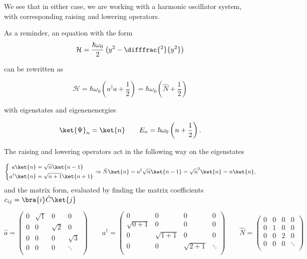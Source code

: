    We  see that  in  either case,  we  are working  with a  harmonic  oscillator system,  with
   corresponding raising and lowering operators.
   
   {\scriptsize As a reminder, an equation with the form
     \[
       \mathcal{H} = \frac{\hbar\omega_0}{2}\left(y^2-\difffrac{^2}{y^2}\right)
     \]
		
     \noindent can be rewritten as
		
		\[
                  \mathcal{H}       =      \hbar\omega_0\left(a^{\dagger}a+\frac{1}{2}\right)=
                  \hbar\omega_0\left(\hat{N}+\frac{1}{2}\right)
		\]
		
		with eigenstates and eigenenenergies
		
		\[
                  \ket{\Psi}_n=\ket{n} \qquad E_n= \hbar\omega_0\left(n+\frac{1}{2}\right).
		\]
		
		\noindent The raising  and lowering operators act in the  following way on the
                eigenstates
		
		\[
                  \left\lbrace\begin{aligned}
                      a\ket{n} & = \sqrt{n}\ket{n-1}\\
                      a^{\dagger}\ket{n} &= \sqrt{n+1}\ket{n+1}\\
                    \end{aligned}\right. \Rightarrow
                  \hat{N}\ket{n} = a^{\dagger}  \sqrt{n}\ket{n-1} = \sqrt{n}^2\ket{n}=n\ket{n}
                  ,
		\]
		\noindent and  the matrix form,  evaluated by finding the  matrix coefficients
                $ c_{ij}=\bra{i}\hat{C}\ket{j} $
		
		\[
                  \hat{a}=\begin{pmatrix}
                    0 & \sqrt{1} & 0 & 0\\
                    0 & 0 & \sqrt{2} & 0\\
                    0 & 0 & 0 & \sqrt{3}\\
                    0 & 0 & 0 & \ddots\\
                  \end{pmatrix} \qquad a^{\dagger}=\begin{pmatrix}
                    0 & 0 & 0 & 0\\
                    \sqrt{0+1} & 0 & 0 & 0\\
                    0 & \sqrt{1+1} & 0 & 0\\
                    0 & 0 & \sqrt{2+1} & \ddots\\
                  \end{pmatrix} \qquad \hat{N} =\begin{pmatrix}
                    0 & 0 & 0 & 0\\
                    0 & 1 & 0 & 0\\
                    0 & 0 & 2 & 0\\
                    0 & 0 & 0 & \ddots\\
                  \end{pmatrix}
		\]
              }
   

